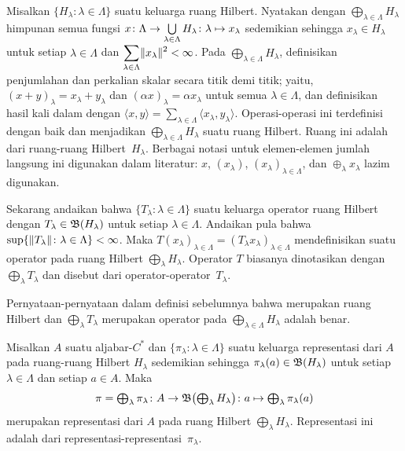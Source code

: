 \begin{defn} Misalkan $\{H_\lambda\colon \lambda \in \Lambda\}$ suatu keluarga ruang Hilbert.
Nyatakan dengan $\bigoplus\limits_{\lambda \in \Lambda} H_\lambda$ himpunan semua fungsi
$x\colon \Lambda \rightarrow \bigcup\limits_{\lambda \in \Lambda} H_\lambda\colon \lambda
\mapsto x_\lambda$ sedemikian sehingga $x_\lambda \in H_\lambda$ untuk setiap $\lambda \in \Lambda$ dan
$\displaystyle\sum\limits_{\lambda \in \Lambda} \lVert x_\lambda\rVert^2 < \infty$. Pada
$\bigoplus\limits_{\lambda \in \Lambda} H_\lambda$, definisikan penjumlahan dan perkalian
skalar secara titik demi titik; yaitu, $(x + y)_\lambda = x_\lambda + y_\lambda$ dan $(\alpha
x)_\lambda = \alpha x_\lambda$ untuk semua $\lambda \in \Lambda$, dan definisikan hasil kali dalam
dengan $\langle x,y \rangle = \sum_{\lambda \in \Lambda} \langle x_\lambda,y_\lambda\rangle$.
Operasi-operasi ini terdefinisi dengan baik dan menjadikan $\bigoplus\limits_{\lambda \in \Lambda}
H_\lambda$ suatu ruang Hilbert. Ruang ini adalah
 dari ruang-ruang Hilbert~$H_\lambda$. Berbagai notasi untuk elemen-elemen jumlah
langsung ini digunakan dalam literatur: $x$, $(x_\lambda)$, $(x_\lambda)_{\lambda \in
\Lambda}$, dan $\oplus_\lambda x_\lambda$ lazim digunakan.

Sekarang andaikan bahwa $\{T_\lambda\colon \lambda \in \Lambda\}$ suatu keluarga operator ruang
Hilbert dengan $T_\lambda \in \mathfrak{B}(H_\lambda)$ untuk setiap $\lambda \in \Lambda$.
Andaikan pula bahwa $\sup\{\lVert T_\lambda\rVert\colon \lambda \in \Lambda\} < \infty$. Maka
$T(x_\lambda)_{\lambda \in \Lambda} = (T_\lambda x_\lambda)_{\lambda \in \Lambda}$
mendefinisikan suatu operator pada ruang Hilbert $\bigoplus_\lambda H_\lambda$. Operator $T$
biasanya dinotasikan dengan $\bigoplus_\lambda T_\lambda$ dan disebut
 dari operator-operator~$T_\lambda$.
\end{defn}

\begin{prop} Pernyataan-pernyataan dalam definisi sebelumnya bahwa
 merupakan ruang Hilbert dan
$\bigoplus_\lambda T_\lambda$ merupakan operator pada $\bigoplus\limits_{\lambda \in \Lambda}
H_\lambda$ adalah benar.
\end{prop}

\begin{exam} Misalkan $A$ suatu aljabar-$C^*$ dan $\{\pi_\lambda\colon \lambda \in \Lambda\}$ suatu
keluarga representasi dari $A$ pada ruang-ruang Hilbert $H_\lambda$ sedemikian sehingga $\pi_\lambda(a)
\in \mathfrak{B}(H_\lambda)$ untuk setiap $\lambda \in \Lambda$ dan setiap $a \in A$. Maka
  \[ \pi = \textstyle{ \bigoplus_\lambda \pi_\lambda\colon A \rightarrow\mathfrak{B}\bigl(\bigoplus_\lambda H_\lambda\bigr)
       \colon a \mapsto \bigoplus_\lambda \pi_\lambda(a)} \]
merupakan representasi dari $A$ pada ruang Hilbert $\bigoplus_\lambda H_\lambda$. Representasi ini adalah
 dari representasi-representasi~$\pi_\lambda$.
\end{exam}

